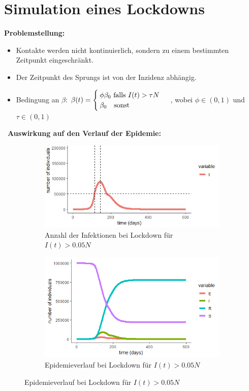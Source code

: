 \documentclass{scrartcl}
\begin{document}
\section{Simulation eines Lockdowns}
\textbf{Problemstellung:}
\begin{itemize}
\item Kontakte werden nicht kontinuierlich, sondern zu einem bestimmten Zeitpunkt eingeschränkt.
\item Der Zeitpunkt des Sprungs ist von der Inzidenz abhängig.
\item Bedingung an $\beta$: 
	$\beta(t) =  \begin{cases} 
					\phi \beta_0 \text{ falls } I(t) > \tau N \\
					\beta_0 \text{\quad sonst}
				\end{cases}$
	, wobei $\phi \in (0,1)$  und $\tau \in (0,1)$
\end{itemize}
 \
\textbf{Auswirkung auf den Verlauf der Epidemie:}
\begin{figure}[h]
\begin{subfigure}[b]{0.495\textwidth}  
		\centering
		\includegraphics[width=\textwidth]{thres-I}  
		\caption{Anzahl der Infektionen bei Lockdown für $I(t) > 0.05N$}
	\end{subfigure}
        \begin{subfigure}[b]{0.455\textwidth}   
            \centering 
            \includegraphics[width=\textwidth]{thres-epi}  
		\caption{Epidemieverlauf bei Lockdown für $I(t) > 0.05N$}           
        \end{subfigure}
 \end{figure}
\end{document}
